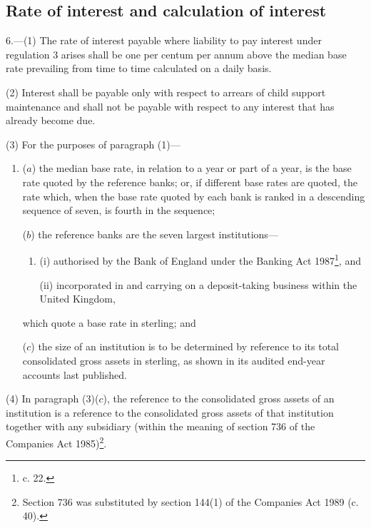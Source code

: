 \documentclass[12pt,a4paper]{article}
\begin{document}

\subsection[6. Rate of interest and calculation of interest]{Rate of interest and calculation of interest}

6.—(1) The rate of interest payable where liability to pay interest under regulation 3 arises shall be one per centum per annum above the median base rate prevailing from time to time calculated on a daily basis.

(2) Interest shall be payable only with respect to arrears of child support maintenance and shall not be payable with respect to any interest that has already become due.

(3) For the purposes of paragraph (1)—
\begin{enumerate}\item[]
($a$) the median base rate, in relation to a year or part of a year, is the base rate quoted by the reference banks; or, if different base rates are quoted, the rate which, when the base rate quoted by each bank is ranked in a descending sequence of seven, is fourth in the sequence;

($b$) the reference banks are the seven largest institutions—
\begin{enumerate}\item[]
(i) authorised by the Bank of England under the Banking Act 1987\footnote{ c. 22.}, and

(ii) incorporated in and carrying on a deposit-taking business within the United Kingdom,
\end{enumerate}
which quote a base rate in sterling; and

($c$) the size of an institution is to be determined by reference to its total consolidated gross assets in sterling, as shown in its audited end-year accounts last published.
\end{enumerate}

(4) In paragraph (3)($c$), the reference to the consolidated gross assets of an institution is a reference to the consolidated gross assets of that institution together with any subsidiary (within the meaning of section 736 of the Companies Act 1985)\footnote{\frenchspacing Section 736 was substituted by section 144(1) of the Companies Act 1989 (c. 40).}.
\end{document}
